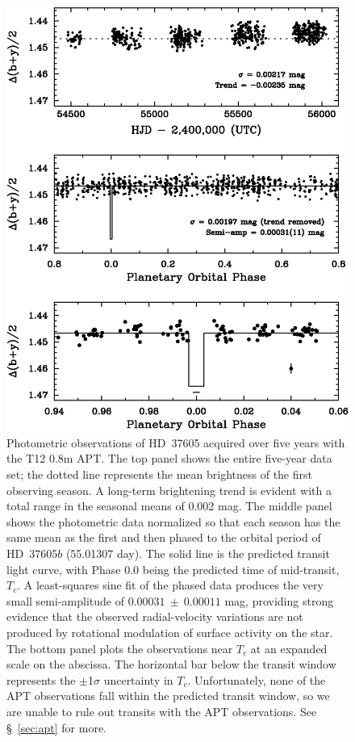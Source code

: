 \begin{figure}
\includegraphics[scale=0.7]{37605/f5.eps}
\caption{Photometric observations of HD~37605 acquired over five years with 
 the T12 0.8m APT.  The top panel shows the entire five-year data set; the 
 dotted line represents the mean brightness of the first observing season.  A 
 long-term brightening trend is evident with a total range in the seasonal 
 means of 0.002 mag.  The middle panel shows the photometric data normalized 
 so that each season has the same mean as the first and then phased to the 
 orbital period of HD~37605$b$ (55.01307 day).  The solid line is the predicted 
 transit light curve, with Phase 0.0 being the predicted time of mid-transit, 
 $T_c$.  A least-squares sine fit of the phased data produces the very small 
 semi-amplitude of $0.00031~\pm~0.00011$ mag, providing strong evidence
 that the observed radial-velocity variations are not produced by
 rotational modulation of surface
 activity on the star.  The bottom panel plots the observations near $T_c$ 
 at an expanded scale on the abscissa.  The horizontal bar below the transit 
 window represents the $\pm$1$\sigma$ uncertainty in $T_c$.  Unfortunately, 
 none of the APT observations fall within the predicted transit window, so 
 we are unable to rule out transits with the APT observations.  See 
\S~\ref{sec:apt} for more. \label{photometry}}
\end{figure}


